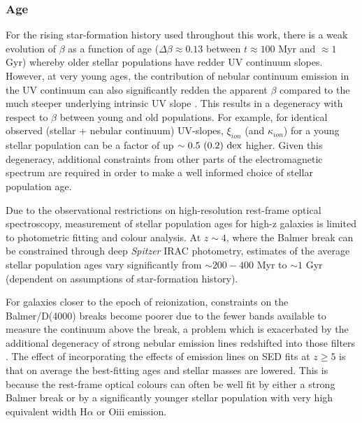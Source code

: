 \subsubsection{Age}
For the rising star-formation history used throughout this work, there is a weak evolution of $\beta$ as a function of age ($\Delta\beta \approx 0.13$ between $t \approx 100$ Myr and $\approx 1$ Gyr) whereby older stellar populations have redder UV continuum slopes. However, at very young ages, the contribution of nebular continuum emission in the UV continuum can also significantly redden the apparent $\beta$ compared to the much steeper underlying intrinsic UV slope \citep{2010Natur.468...49R}.  This results in a degeneracy with respect to $\beta$ between young and old populations. For example, for identical observed (stellar + nebular continuum) UV-slopes, $\xi_{ion}$ (and $\kappa_{ion}$) for a young stellar population can be a factor of up $\sim 0.5~ (0.2)~\rm{dex}$ higher. Given this degeneracy, additional constraints from other parts of the electromagnetic spectrum are required in order to make a well informed choice of stellar population age.

Due to the observational restrictions on high-resolution rest-frame optical spectroscopy, measurement of stellar population ages for high-z galaxies is limited to photometric fitting and colour analysis. At $z\sim4$, where the Balmer break can be constrained through deep \emph{Spitzer} IRAC photometry, estimates of the average stellar population ages vary significantly from $\sim 200-400$ Myr \citep{Lee:2011dw} to $\sim1$ Gyr \citep{Oesch:2013eb} (dependent on assumptions of star-formation history). 
 
    
For galaxies closer to the epoch of reionization, constraints on the Balmer/D(4000) breaks become poorer due to the fewer bands available to measure the continuum above the break, a problem which is exacerbated by the additional degeneracy of strong nebular emission lines redshifted into those filters \citep{2009A&A...502..423S,2010A&A...515A..73S}. The effect of incorporating the effects of emission lines on SED fits at $z \geq 5$ is that on average the best-fitting ages and stellar masses are lowered. This is because the rest-frame optical colours can often be well fit by either a strong Balmer break or by a significantly younger stellar population with very high equivalent width H$\alpha$ or {\sc Oiii} emission. 

